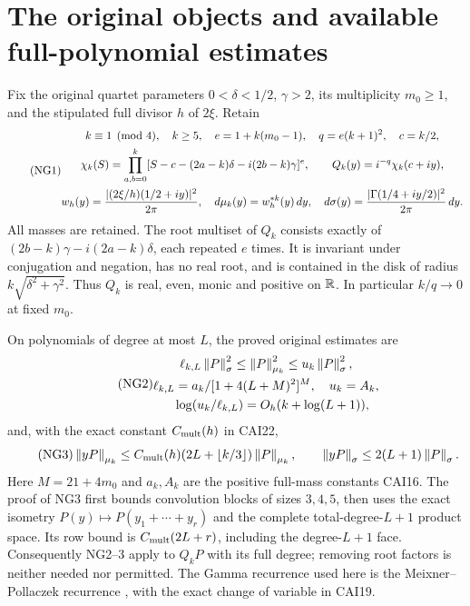 \documentclass[11pt]{article}
\begin{document}
\section{The original objects and available full-polynomial estimates}
Fix the original quartet parameters $0<\delta<1/2$, $\gamma>2$, its
multiplicity $m_0\ge1$, and the stipulated full divisor $h$ of $2\xi$.
Retain
\begin{equation}\tag{NG1}
 \begin{gathered}
 k\equiv1\pmod4,\quad k\ge5,\quad e=1+k(m_0-1),\quad q=e(k+1)^2,\quad c=k/2,\\
 \chi_k(S)=\prod_{a,b=0}^k
 [S-c-(2a-k)\delta-i(2b-k)\gamma]^e,\qquad
 Q_k(y)=i^{-q}\chi_k(c+iy),\\
 w_h(y)=\frac{|(2\xi/h)(1/2+iy)|^2}{2\pi},\quad
 d\mu_k(y)=w_h^{*k}(y)\,d y,\quad
 d\sigma(y)=\frac{|\Gamma(1/4+iy/2)|^2}{2\pi}\,d y.
 \end{gathered}
\end{equation}
All masses are retained. The root multiset of $Q_k$ consists exactly of
$(2b-k)\gamma-i(2a-k)\delta$, each repeated $e$ times. It is invariant
under conjugation and negation, has no real root, and is contained in the
disk of radius $k\sqrt{\delta^2+\gamma^2}$. Thus $Q_k$ is real, even,
monic and positive on $\mathbb R$. In particular $k/q\to0$ at fixed $m_0$.

On polynomials of degree at most $L$, the proved original estimates are
\begin{equation}\tag{NG2}
 \begin{gathered}
 \ell_{k,L}\left\lVert P\right\rVert_\sigma^2\le\left\lVert P\right\rVert_{\mu_k}^2
 \le u_k\left\lVert P\right\rVert_\sigma^2,\\
 \ell_{k,L}=a_k/[1+4(L+M)^2]^M,
 \quad u_k=A_k,\\
 \quad \log(u_k/\ell_{k,L})=O_h(k+\log(L+1)),
 \end{gathered}
\end{equation}
and, with the exact constant $C_{\rm mult}(h)$ in CAI22,
\begin{equation}\tag{NG3}
 \left\lVert yP\right\rVert_{\mu_k}\le C_{\rm mult}(h)(2L+\lfloor k/3\rfloor)
                    \left\lVert P\right\rVert_{\mu_k},\qquad
 \left\lVert yP\right\rVert_\sigma\le2(L+1)\left\lVert P\right\rVert_\sigma.
\end{equation}
Here $M=21+4m_0$ and $a_k,A_k$ are the positive full-mass constants
CAI16. The proof of NG3 first bounds convolution blocks of sizes $3,4,5$,
then uses the exact isometry $P(y)\mapsto P(y_1+\cdots+y_r)$ and the
complete total-degree-$L+1$ product space. Its row bound is
$C_{\rm mult}(2L+r)$, including the degree-$L+1$ face. Consequently
NG2--3 apply to $Q_kP$ with its full degree; removing root factors is
neither needed nor permitted. The Gamma recurrence used here is the
Meixner--Pollaczek recurrence \cite[18.22.8,18.23.7]{garnative:dlmf}, with the exact
change of variable in CAI19.
\end{document}
